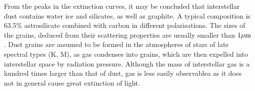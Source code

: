 From the peaks in the extinction curves, it may be concluded that interstellar dust contains water ice and silicates, as well as graphite. A typical composition \citep{Weingartner2001} is 63.5\% astrosilicate combined with carbon in different polarisations. The sizes of the grains, deduced from their scattering properties are usually smaller than $1 \rm{\mu m}$. Dust grains are assumed to be formed in the atmospheres of stars of late spectral types (K, M), as gas condenses into grains, which are then expelled into interstellar space by radiation pressure. Although the mass of interstellar gas is a hundred times larger than that of dust, gas is less easily observablea as it does not in general cause great extinction of light. 

